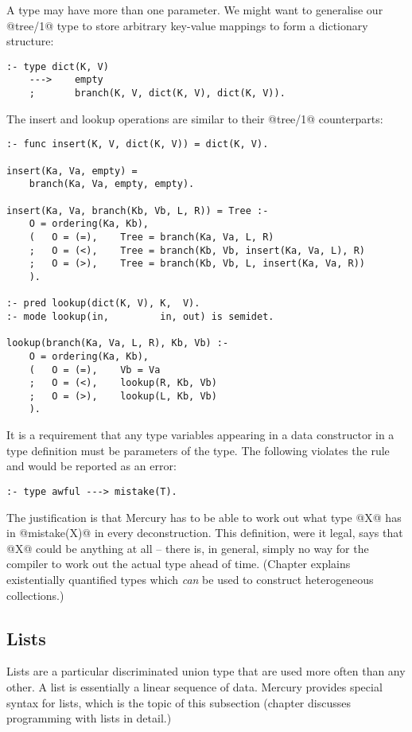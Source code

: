 A type may have more than one parameter.  We might want to
generalise our @tree/1@ type to store arbitrary key-value mappings to form a
dictionary structure:
\begin{verbatim}
:- type dict(K, V)
    --->    empty
    ;       branch(K, V, dict(K, V), dict(K, V)).
\end{verbatim}
The insert and lookup operations are similar to their @tree/1@ counterparts:
\begin{verbatim}
:- func insert(K, V, dict(K, V)) = dict(K, V).

insert(Ka, Va, empty) =
    branch(Ka, Va, empty, empty).

insert(Ka, Va, branch(Kb, Vb, L, R)) = Tree :-
    O = ordering(Ka, Kb),
    (   O = (=),    Tree = branch(Ka, Va, L, R)
    ;   O = (<),    Tree = branch(Kb, Vb, insert(Ka, Va, L), R)
    ;   O = (>),    Tree = branch(Kb, Vb, L, insert(Ka, Va, R))
    ).

:- pred lookup(dict(K, V), K,  V).
:- mode lookup(in,         in, out) is semidet.

lookup(branch(Ka, Va, L, R), Kb, Vb) :-
    O = ordering(Ka, Kb),
    (   O = (=),    Vb = Va
    ;   O = (<),    lookup(R, Kb, Vb)
    ;   O = (>),    lookup(L, Kb, Vb)
    ).
\end{verbatim}
It is a requirement that any type variables appearing in a data constructor
in a type definition must be parameters of the type.  The following
violates the rule and would be reported as an error:
\begin{verbatim}
:- type awful ---> mistake(T).
\end{verbatim}
The justification is that Mercury has to be able to work out what type @X@
has in @mistake(X)@ in every deconstruction.
This definition,
were it legal, says that @X@ could be anything at all
-- there is, in general, simply no way for the compiler to work out the
actual type ahead of time.
(Chapter \XXX{} explains existentially quantified types which \emph{can} be
used to construct heterogeneous collections.)

\subsection{Lists}

Lists are a particular discriminated union type that are used more often
than any other.  A list is essentially a linear sequence of data.  Mercury
provides special syntax for lists, which is the topic of this subsection
(chapter \XXX{} discusses programming with lists in detail.)

